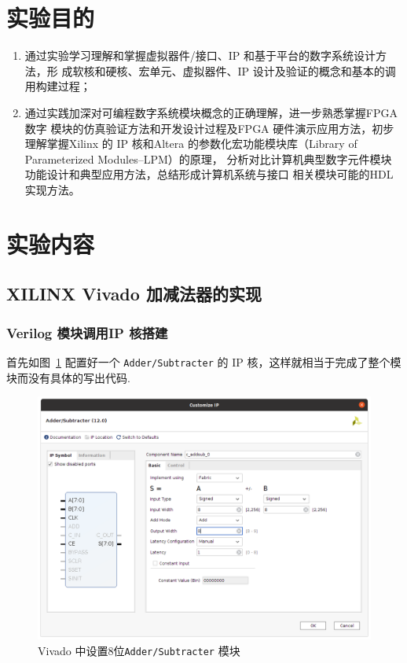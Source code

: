 \documentclass[11pt]{SEU-Digital-Report}
\begin{document}
  \exptitlepage

  \tableofcontents
  \newpage

  \section{实验目的}
        
    \begin{enumerate}
        \item 通过实验学习理解和掌握虚拟器件/接口、IP 和基于平台的数字系统设计方法，形
        成软核和硬核、宏单元、虚拟器件、IP 设计及验证的概念和基本的调用构建过程；
        \item 通过实践加深对可编程数字系统模块概念的正确理解，进一步熟悉掌握FPGA 数字
        模块的仿真验证方法和开发设计过程及FPGA 硬件演示应用方法，初步理解掌握Xilinx 的
        IP 核和Altera 的参数化宏功能模块库（Library of Parameterized Modules--LPM）的原理，
        分析对比计算机典型数字元件模块功能设计和典型应用方法，总结形成计算机系统与接口
        相关模块可能的HDL 实现方法。
    \end{enumerate}

  \section{实验内容}

    \subsection{XILINX Vivado 加减法器的实现}

      \subsubsection{Verilog 模块调用IP 核搭建}

        首先如图~\ref{fig:IP_add_sub_8} 配置好一个 \texttt{Adder/Subtracter} 的 IP 核，这样就相当于完成了整个模块而没有具体的写出代码.

        \begin{figure}[htbp]
          \centering
          \includegraphics[width=.6\linewidth]{fig/IP_add_sub_8.png}
          \caption{Vivado 中设置8位\texttt{Adder/Subtracter} 模块}
          \label{fig:IP_add_sub_8}
        \end{figure}
\end{document}
